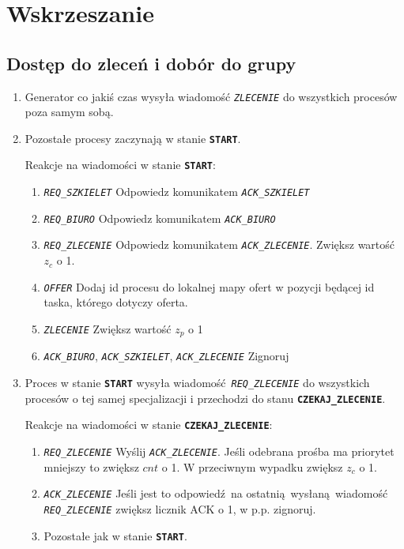 \documentclass[12pt]{article}
\newcommand{\state}[1]{\texttt{\textbf{#1}}}
\newcommand{\msg}[1]{\texttt{\emph{#1}}}
\begin{document}
\section{Wskrzeszanie}

\subsection{Dostęp do zleceń i dobór do grupy}
\begin{enumerate}
	\item Generator co jakiś czas wysyła wiadomość \msg{ZLECENIE} do wszystkich procesów poza samym sobą.
	
	\item Pozostałe procesy zaczynają w stanie \state{START}.
	
	Reakcje na wiadomości w stanie \state{START}:
	\begin{enumerate}
		\item \msg{REQ\_SZKIELET} Odpowiedz komunikatem \msg{ACK\_SZKIELET}
		\item \msg{REQ\_BIURO} Odpowiedz komunikatem \msg{ACK\_BIURO}
		\item \msg{REQ\_ZLECENIE} Odpowiedz komunikatem \msg{ACK\_ZLECENIE}. Zwiększ wartość $z_c$ o 1.
		\item \msg{OFFER} Dodaj id procesu do lokalnej mapy ofert w pozycji będącej id taska, którego dotyczy oferta.
		\item \msg{ZLECENIE} Zwiększ wartość $z_p$ o 1
		\item \msg{ACK\_BIURO}, \msg{ACK\_SZKIELET}, \msg{ACK\_ZLECENIE} Zignoruj
	\end{enumerate}
		
	\item Proces w stanie \state{START} wysyła wiadomość \msg{REQ\_ZLECENIE} do wszystkich procesów o tej samej specjalizacji i przechodzi do stanu \state{CZEKAJ\_ZLECENIE}.
	
	Reakcje na wiadomości w stanie \state{CZEKAJ\_ZLECENIE}:
	\begin{enumerate}
		\item \msg{REQ\_ZLECENIE} Wyślij \msg{ACK\_ZLECENIE}. Jeśli odebrana prośba ma priorytet mniejszy to zwiększ $cnt$ o 1. W przeciwnym wypadku zwiększ $z_c$ o 1.
		\item \msg{ACK\_ZLECENIE} Jeśli jest to odpowiedź na ostatnią wysłaną wiadomość \msg{REQ\_ZLECENIE} zwiększ licznik ACK o 1, w p.p. zignoruj.
		\item Pozostałe jak w stanie \state{START}.
	\end{enumerate}
		

\end{enumerate}
\end{document}

